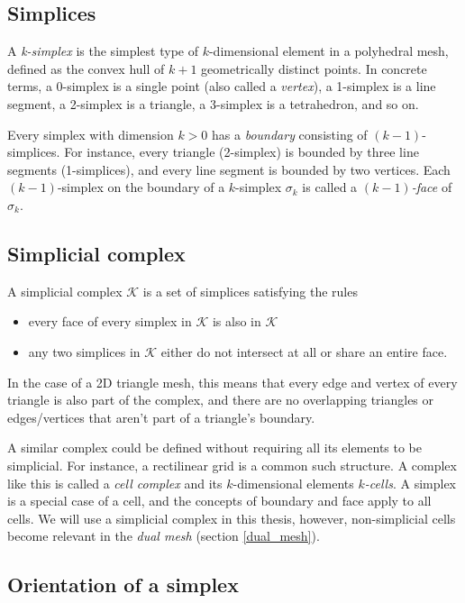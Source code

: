 \documentclass[utf8,english]{gradu3}
\begin{document}
\subsection{Simplices}

A \textit{k-simplex} is the simplest type of $k$-dimensional element
in a polyhedral mesh, defined as
the convex hull of $k + 1$ geometrically distinct points.
In concrete terms, a 0-simplex is a single point (also called a \textit{vertex}),
a 1-simplex is a line segment,
a 2-simplex is a triangle,
a 3-simplex is a tetrahedron, and so on.

Every simplex with dimension $k > 0$
has a \textit{boundary} consisting of $(k-1)$-simplices.
For instance, every triangle (2-simplex) is bounded by three line segments (1-simplices),
and every line segment is bounded by two vertices.
Each $(k-1)$-simplex on the boundary of a $k$-simplex $\sigma_k$
is called a \textit{$(k-1)$-face} of $\sigma_k$.

\subsection{Simplicial complex}

A simplicial complex $\mathcal{K}$ is a set of simplices satisfying the rules

\begin{itemize}
  \item every face of every simplex in $\mathcal{K}$ is also in $\mathcal{K}$
  \item any two simplices in $\mathcal{K}$ either do not intersect at all
    or share an entire face.
\end{itemize}

In the case of a 2D triangle mesh, this means
that every edge and vertex of every triangle is also part of the complex,
and there are no overlapping triangles
or edges/vertices that aren't part of a triangle's boundary.

A similar complex could be defined without requiring
all its elements to be simplicial.
For instance, a rectilinear grid is a common such structure.
A complex like this is called a \textit{cell complex}
and its $k$-dimensional elements \textit{$k$-cells}.
A simplex is a special case of a cell,
and the concepts of boundary and face apply to all cells.
We will use a simplicial complex in this thesis,
however, non-simplicial cells become relevant in the \textit{dual mesh}
(section \ref{dual_mesh}).

\subsection{Orientation of a simplex}
\end{document}
